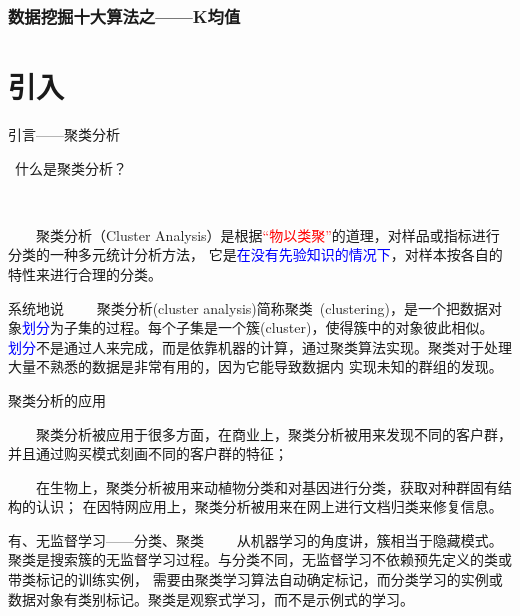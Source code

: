 \documentclass[cjk]{beamer}
\begin{document}
\begin{CJK*}{GBK}{kai}
\begin{frame}
 \frametitle{数据挖掘十大算法之——K均值}
 \tableofcontents
\end{frame}




\section{引入}

\begin{frame}{引言——聚类分析}
\

{\bf{\color{red!75!black}{\large Q:}}}\ 什么是聚类分析？

\

\ \ \ \ 聚类分析（Cluster Analysis）是根据\textcolor{red}{“物以类聚”}的道理，对样品或指标进行分类的一种多元统计分析方法，
它是\textcolor{blue}{在没有先验知识的情况下}，对样本按各自的特性来进行合理的分类。

\end{frame}

\begin{frame}{系统地说}
  \ \ \ \ 聚类分析(cluster analysis)简称聚类~(clustering)，是一个把数据对象\textcolor{blue}{划分}为子集的过程。每个子集是一个簇(cluster)，使得簇中的对象彼此相似。
  \textcolor{blue}{划分}不是通过人来完成，而是依靠机器的计算，通过聚类算法实现。聚类对于处理大量不熟悉的数据是非常有用的，因为它能导致数据内
  实现未知的群组的发现。
\end{frame}


\begin{frame}{聚类分析的应用}

\ \ \ \ 聚类分析被应用于很多方面，在商业上，聚类分析被用来发现不同的客户群，并且通过购买模式刻画不同的客户群的特征；

\ \ \ \ 在生物上，聚类分析被用来动植物分类和对基因进行分类，获取对种群固有结构的认识；
在因特网应用上，聚类分析被用来在网上进行文档归类来修复信息。

\end{frame}

\begin{frame}{有、无监督学习——分类、聚类}
  \ \ \ \ 从机器学习的角度讲，簇相当于隐藏模式。聚类是搜索簇的无监督学习过程。与分类不同，无监督学习不依赖预先定义的类或带类标记的训练实例，
  需要由聚类学习算法自动确定标记，而分类学习的实例或数据对象有类别标记。聚类是观察式学习，而不是示例式的学习。
\end{frame}


\end{CJK*}
\end{document}
